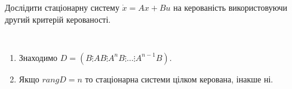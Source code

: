 \begin{problem*}
	Дослідити стаціонарну систему $\dot x = A x + B u$ на керованість використовуючи другий критерій керованості.
\end{problem*}

\begin{algorithm} \tt
	\begin{enumerate}
		\item Знаходимо $D = \left(B \vdots AB \vdots A^nB \vdots\ldots\vdots A^{n-1}B\right)$.
		\item Якщо $rang D = n$ то стаціонарна системи цілком керована, інакше ні.
	\end{enumerate}
\end{algorithm}
